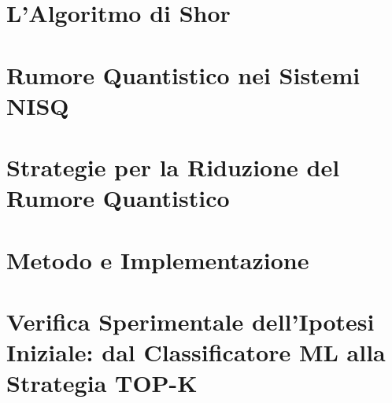\documentclass[oneside, 12pt]{report}
\begin{document}
\chapter{L'Algoritmo di Shor}
\label{chap:shor}



\chapter{Rumore Quantistico nei Sistemi NISQ}
\label{chap:rumore}


\chapter{Strategie per la Riduzione del Rumore Quantistico}
\label{chap:strategie}


\chapter{Metodo e Implementazione}
\label{chap:metodologia}
\label{chap:sviluppo}



% 



\chapter{Verifica Sperimentale dell'Ipotesi Iniziale: dal Classificatore ML alla Strategia TOP-K}
\label{chap:risultati}
\label{chap:risultati1}    %
\label{chap:conclusioni1}  %
\label{chap:risultati2}    %
\label{chap:conclusioni2}  %

\end{document}
